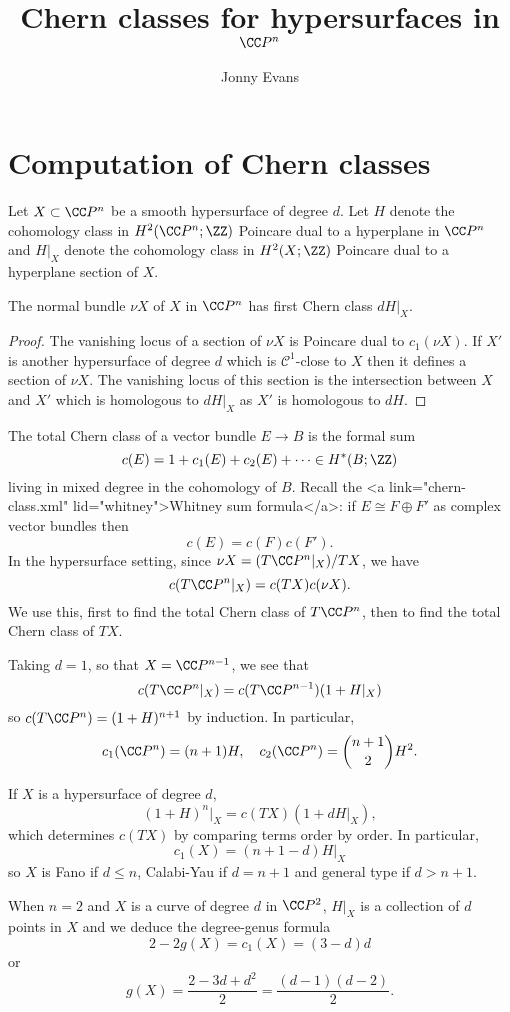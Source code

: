 
\title{Chern classes for hypersurfaces in $\CC P^n$}
\author{Jonny Evans}





\section{Computation of Chern classes}

Let $X\subset\CC P^n$ be a smooth hypersurface of degree $d$. Let $H$ denote the cohomology class in $H^2(\CC P^n;\ZZ)$ Poincare dual to a hyperplane in $\CC P^n$ and $H|_X$ denote the cohomology class in $H^2(X;\ZZ)$ Poincare dual to a hyperplane section of $X$.

\begin{Lemma}
  The normal bundle $\nu X$ of $X$ in $\CC P^n$ has first Chern class $dH|_X$.
\end{Lemma}
\begin{proof}
  The vanishing locus of a section of $\nu X$ is Poincare dual to $c_1(\nu X)$. If $X'$ is another hypersurface of degree $d$ which is $\mathcal{C}^1$-close to $X$ then it defines a section of $\nu X$. The vanishing locus of this section is the intersection between $X$ and $X'$ which is homologous to $dH|_X$ as $X'$ is homologous to $dH$.
\end{proof}

The total Chern class of a vector bundle $E\to B$ is the formal sum
\[c(E)=1+c_1(E)+c_2(E)+\cdots\in H^*(B;\ZZ)\]
living in mixed degree in the cohomology of $B$. Recall the <a link="chern-class.xml" lid="whitney">Whitney sum formula</a>: if $E\cong F\oplus F'$ as complex vector bundles then
\[c(E)=c(F)c(F').\]
In the hypersurface setting, since $\nu X=(T\CC P^n|_X)/TX$, we have
\[c(T\CC P^n|_X)=c(TX)c(\nu X).\]
We use this, first to find the total Chern class of $T\CC P^n$, then to find the total Chern class of $TX$.

\begin{Corollary}[corcherncp]
  Taking $d=1$, so that $X=\CC P^{n-1}$, we see that
  \[c(T\CC P^n|_X)=c(T\CC P^{n-1})(1+H|_X)\]
  so $c(T\CC P^n)=(1+H)^{n+1}$ by induction. In particular,
  \[c_1(\CC P^n)=(n+1)H,\quad c_2(\CC P^n)=\binom{n+1}{2}H^2.\]
\end{Corollary}

\begin{Corollary}
  If $X$ is a hypersurface of degree $d$,
  \[(1+H)^n|_X=c(TX)(1+dH|_X),\]
  which determines $c(TX)$ by comparing terms order by order. In particular,
  \[c_1(X)=(n+1-d)H|_X\]
  so $X$ is Fano if $d\leq n$, Calabi-Yau if $d=n+1$ and general type if $d>n+1$.
\end{Corollary}

\begin{Corollary}
  When $n=2$ and $X$ is a curve of degree $d$ in $\CC P^2$, $H|_X$ is a collection of $d$ points in $X$ and we deduce the degree-genus formula
  \[2-2g(X)=c_1(X)=(3-d)d\]
  or
  \[g(X)=\frac{2-3d+d^2}{2}=\frac{(d-1)(d-2)}{2}.\]
\end{Corollary}


